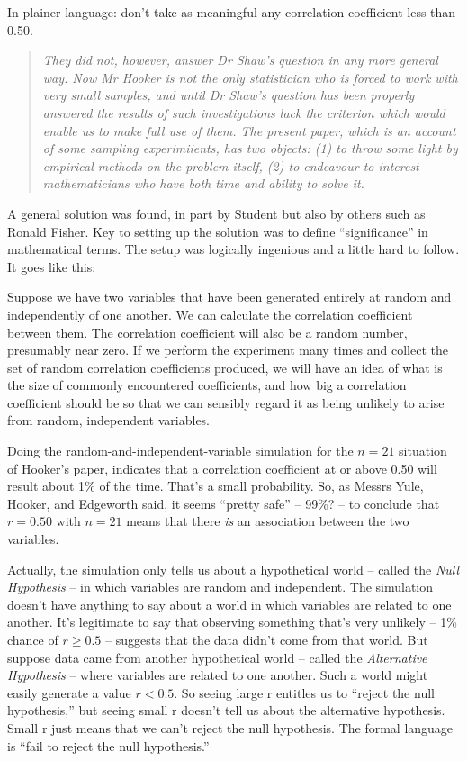 \documentclass[]{tufte-book}
\begin{document}
In plainer language: don't take as meaningful any correlation coefficient less than 0.50.

\begin{quote}
\emph{They did not, however, answer Dr Shaw's question in any more general way. Now Mr Hooker is not the only statistician who is forced to work with very small samples, and until Dr Shaw's question has been properly answered the results of such investigations lack the criterion which would enable us to make full use of them. The present paper, which is an account of some sampling experimiients, has two objects: (1) to throw some light by empirical methods on the problem itself, (2) to endeavour to interest mathematicians who have both time and ability to solve it.}
\end{quote}

A general solution was found, in part by Student but also by others such as Ronald Fisher. Key to setting up the solution was to define ``significance'' in mathematical terms. The setup was logically ingenious and a little hard to follow. It goes like this:

Suppose we have two variables that have been generated entirely at random and independently of one another. We can calculate the correlation coefficient between them. The correlation coefficient will also be a random number, presumably near zero. If we perform the experiment many times and collect the set of random correlation coefficients produced, we will have an idea of what is the size of commonly encountered coefficients, and how big a correlation coefficient should be so that we can sensibly regard it as being unlikely to arise from random, independent variables.

Doing the random-and-independent-variable simulation for the \(n = 21\) situation of Hooker's paper, indicates that a correlation coefficient at or above 0.50 will result about 1\% of the time. That's a small probability. So, as Messrs Yule, Hooker, and Edgeworth said, it seems ``pretty safe'' -- 99\%? -- to conclude that \(r = 0.50\) with \(n=21\) means that there \emph{is} an association between the two variables.

Actually, the simulation only tells us about a hypothetical world -- called the \emph{Null Hypothesis} -- in which variables are random and independent. The simulation doesn't have anything to say about a world in which variables are related to one another. It's legitimate to say that observing something that's very unlikely -- 1\% chance of \(r \ge 0.5\) -- suggests that the data didn't come from that world. But suppose data came from another hypothetical world -- called the \emph{Alternative Hypothesis} -- where variables are related to one another. Such a world might easily generate a value \(r < 0.5\). So seeing large r entitles us to ``reject the null hypothesis,'' but seeing small r doesn't tell us about the alternative hypothesis. Small r just means that we can't reject the null hypothesis. The formal language is ``fail to reject the null hypothesis.''
\end{document}

